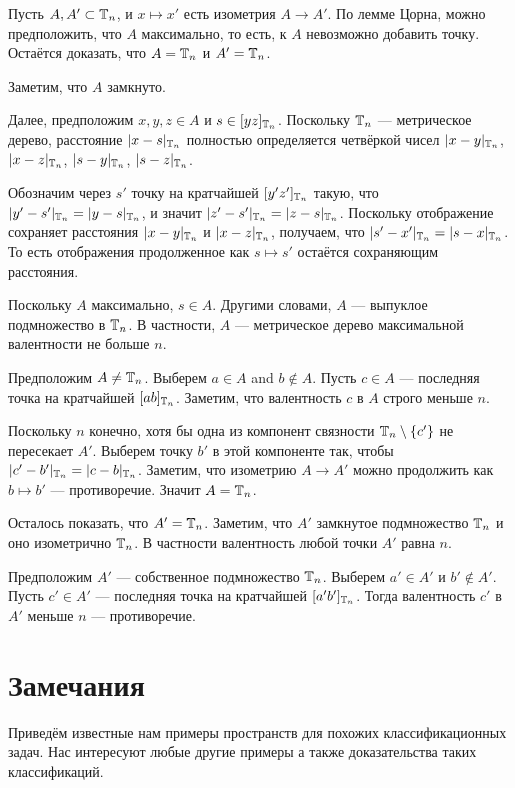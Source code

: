 \documentclass[a4paper,10pt]{article}
\begin{document}
Пусть $A, A'\subset \mathbb{T}_n$, и $x\mapsto x'$ есть изометрия $A\to A'$.
По лемме Цорна, можно предположить, что $A$ максимально,
то есть, к $A$ невозможно добавить точку.
Остаётся доказать, что $A=\mathbb{T}_n$ и $A'=\mathbb{T}_n$.

Заметим, что $A$ замкнуто.

Далее, предположим $x,y,z\in A$ и $s\in [yz]_{\mathbb{T}_n}$.
Поскольку $\mathbb{T}_n$ --- метрическое дерево, расстояние $|x-s|_{\mathbb{T}_n}$ полностью определяется четвёркой чисел 
$|x-y|_{\mathbb{T}_n}$, $|x-z|_{\mathbb{T}_n}$, $|s-y|_{\mathbb{T}_n}$, $|s-z|_{\mathbb{T}_n}$.

Обозначим через $s'$ точку на кратчайшей $[y'z']_{\mathbb{T}_n}$ такую, что $|y'-s'|_{\TT_n}\z=|y-s|_{\TT_n}$, и значит $|z'-s'|_{\mathbb{T}_n}=|z-s|_{\mathbb{T}_n}$.
Поскольку отображение сохраняет расстояния $|x-y|_{\mathbb{T}_n}$ и $|x-z|_{\mathbb{T}_n}$,
получаем, что $|s'-x'|_{\mathbb{T}_n}=|s-x|_{\mathbb{T}_n}$.
То есть отображения продолженное как $s\mapsto s'$ остаётся сохраняющим расстояния.

Поскольку $A$ максимально, $s\in A$.
Другими словами, $A$ --- выпуклое подмножество в $\mathbb{T}_n$.
В частности, $A$ --- метрическое дерево максимальной валентности не больше $n$.

Предположим $A\ne \mathbb{T}_n$.
Выберем $a\in A$ and $b\notin A$.
Пусть $c\in A$ --- последняя точка на кратчайшей $[ab]_{\mathbb{T}_n}$.
Заметим, что валентность $c$ в $A$ строго меньше $n$.

Поскольку $n$ конечно, хотя бы одна из компонент связности $\TT_n\z\setminus \{c'\}$ не пересекает $A'$.
Выберем точку $b'$ в этой компоненте так, чтобы $|c'-b'|_{\TT_n}\z=|c-b|_{\TT_n}$.
Заметим, что изометрию $A\to A'$ можно продолжить как $b\mapsto b'$ --- противоречие.
Значит $A=\mathbb{T}_n$.

Осталось показать, что $A'=\mathbb{T}_n$.
Заметим, что $A'$ замкнутое подмножество $\mathbb{T}_n$ и оно изометрично $\mathbb{T}_n$.
В частности валентность любой точки $A'$ равна $n$.

Предположим $A'$ --- собственное подмножество $\mathbb{T}_n$.
Выберем $a'\in A'$ и $b'\notin A'$.
Пусть $c'\in A'$ --- последняя точка на кратчайшей $[a'b']_{\mathbb{T}_n}$.
Тогда валентность $c'$ в $A'$ меньше $n$ --- противоречие.
\qeds

\section{Замечания}

Приведём известные нам примеры пространств для похожих классификационных задач.
Нас интересуют любые другие примеры а также доказательства таких классификаций.
\end{document}
